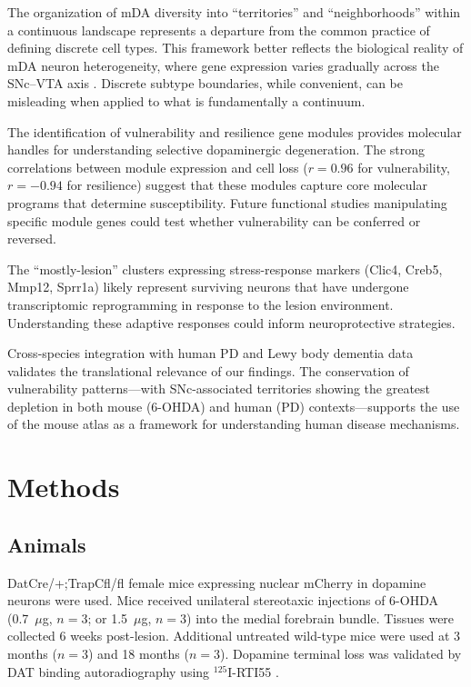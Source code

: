 \documentclass[11pt]{article}
\begin{document}
The organization of mDA diversity into ``territories'' and ``neighborhoods'' within a continuous landscape represents a departure from the common practice of defining discrete cell types. This framework better reflects the biological reality of mDA neuron heterogeneity, where gene expression varies gradually across the SNc--VTA axis \citep{poulin2018defining}. Discrete subtype boundaries, while convenient, can be misleading when applied to what is fundamentally a continuum.

The identification of vulnerability and resilience gene modules provides molecular handles for understanding selective dopaminergic degeneration. The strong correlations between module expression and cell loss ($r = 0.96$ for vulnerability, $r = -0.94$ for resilience) suggest that these modules capture core molecular programs that determine susceptibility. Future functional studies manipulating specific module genes could test whether vulnerability can be conferred or reversed.

The ``mostly-lesion'' clusters expressing stress-response markers (Clic4, Creb5, Mmp12, Sprr1a) likely represent surviving neurons that have undergone transcriptomic reprogramming in response to the lesion environment. Understanding these adaptive responses could inform neuroprotective strategies.

Cross-species integration with human PD and Lewy body dementia data \citep{kamath2022single, parkinson_disease2017, lewy_body2017} validates the translational relevance of our findings. The conservation of vulnerability patterns---with SNc-associated territories showing the greatest depletion in both mouse (6-OHDA) and human (PD) contexts---supports the use of the mouse atlas as a framework for understanding human disease mechanisms.

\section{Methods}

\subsection{Animals}

DatCre/+;TrapCfl/fl female mice expressing nuclear mCherry in dopamine neurons were used. Mice received unilateral stereotaxic injections of 6-OHDA (0.7~$\mu$g, $n = 3$; or 1.5~$\mu$g, $n = 3$) into the medial forebrain bundle. Tissues were collected 6 weeks post-lesion. Additional untreated wild-type mice were used at 3 months ($n = 3$) and 18 months ($n = 3$). Dopamine terminal loss was validated by DAT binding autoradiography using $^{125}$I-RTI55 \citep{dat_autoradiography2010}.
\end{document}
